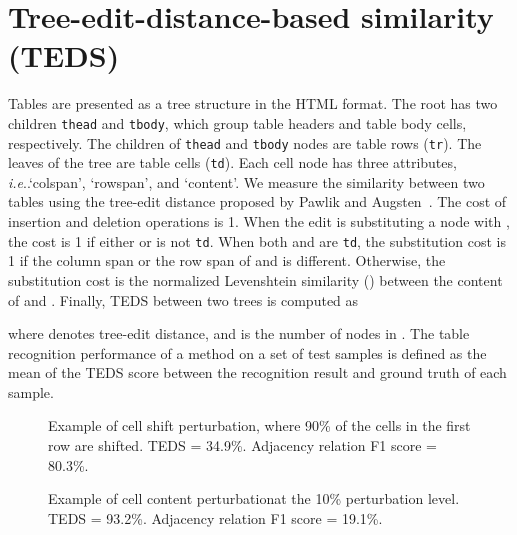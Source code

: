 \documentclass[conference]{IEEEtran}
\makeatletter
\DeclareRobustCommand\onedot{\futurelet\@let@token\@onedot}
\def\@onedot{\ifx\@let@token.\else.\null\fi\xspace}
\def\ie{\emph{i.e}\onedot} \def\Ie{\emph{I.e}\onedot}
\makeatother
\begin{document}
\section{Tree-edit-distance-based similarity (TEDS)}
\label{sec:metric}
Tables are presented as a tree structure in the HTML format. The root has two
children \texttt{thead} and \texttt{tbody}, which group table headers and table
body cells, respectively. The children of \texttt{thead} and \texttt{tbody}
nodes are table rows (\texttt{tr}). The leaves of the tree are table cells
(\texttt{td}). Each cell node has three attributes, \ie `colspan', `rowspan',
and `content'. We measure the similarity between two tables using the tree-edit
distance proposed by Pawlik and Augsten~\cite{pawlik2016tree}. The cost of
insertion and deletion operations is 1. When the edit is substituting a node
 with , the cost is 1 if either  or  is not \texttt{td}.
When both  and  are \texttt{td}, the substitution cost is 1 if the
column span or the row span of  and  is different. Otherwise, the
substitution cost is the normalized Levenshtein
similarity\cite{levenshtein1966binary} () between the content of
 and . Finally, TEDS between two trees is computed as

where  denotes tree-edit distance, and  is the number of nodes in
. The table recognition performance of a method on a set of test samples is
defined as the mean of the TEDS score between the recognition result and ground
truth of each sample.

\begin{figure*}[!ht]
  \centering
  \begin{minipage}[b]{.4\textwidth}\end{minipage}\begin{minipage}[b]{.4\textwidth}\end{minipage}\caption{Example of cell shift perturbation, where 90\% of the cells in the
  first row are shifted. TEDS = 34.9\%. Adjacency relation F1 score = 80.3\%.}
  \label{fig:shift_example}
\end{figure*}

\begin{figure*}[!ht]
  \centering
  \begin{minipage}[b]{.4\textwidth}\end{minipage}\begin{minipage}[b]{.4\textwidth}\end{minipage}\caption{Example of cell content perturbationat the 10\% perturbation level. TEDS = 93.2\%. Adjacency relation F1 score = 19.1\%.}
  \label{fig:ocr_example}
\end{figure*}
\end{document}
